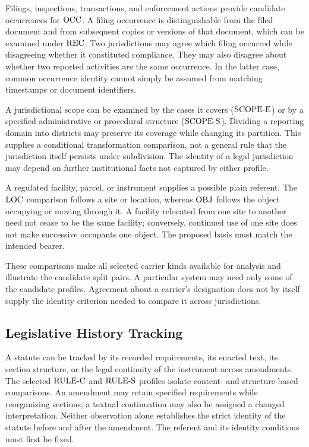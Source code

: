 Filings, inspections, transactions, and enforcement actions provide
candidate occurrences for $\mathrm{OCC}$.
A filing occurrence is distinguishable
from the filed document and from subsequent copies or versions of that
document, which can be examined under $\mathrm{REC}$.
Two jurisdictions may agree
which filing occurred while disagreeing whether it constituted compliance.
They may also disagree about whether two reported activities are the same
occurrence.
In the latter case, common occurrence identity cannot simply
be assumed from matching timestamps or document identifiers.

A jurisdictional scope can be examined by the cases it covers
($\mathrm{SCOPE\text{-}E}$) or by a specified administrative or procedural structure
($\mathrm{SCOPE\text{-}S}$).
Dividing a reporting domain into districts may preserve
its coverage while changing its partition.
This supplies a conditional
transformation comparison, not a general rule that the jurisdiction
itself persists under subdivision.
The identity of a legal jurisdiction
may depend on further institutional facts not captured by either profile.

A regulated facility, parcel, or instrument supplies a possible plain
referent.
The $\mathrm{LOC}$ comparison follows a site or location, whereas
$\mathrm{OBJ}$ follows the object occupying or moving through it.
A facility
relocated from one site to another need not cease to be the same
facility; conversely, continued use of one site does not make successive
occupants one object.
The proposed basis must match the intended bearer.

These comparisons make all selected carrier kinds available for
analysis and illustrate the candidate split pairs.
A particular system may need only some of the candidate profiles.
Agreement about a carrier's designation does not by itself supply the
identity criterion needed to compare it across jurisdictions.

\subsection{Legislative History Tracking}
\label{subsec:app_legislative}

A statute can be tracked by its recorded requirements, its enacted text,
its section structure, or the legal continuity of the instrument across
amendments.
The selected $\mathrm{RULE\text{-}C}$ and $\mathrm{RULE\text{-}S}$ profiles isolate content-
and structure-based comparisons.
An amendment may retain specified
requirements while reorganizing sections; a textual continuation may
also be assigned a changed interpretation.
Neither observation alone
establishes the strict identity of the statute before and after the
amendment.
The referent and its identity conditions must first be fixed.

